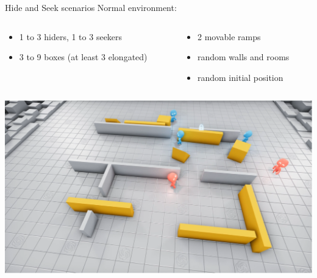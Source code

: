 \documentclass[9pt, hyperref={pdfusetitle,colorlinks=true,allcolors=DarkBlue}]{beamer}
\begin{document}
\begin{frame}{Hide and Seek scenarios}
Normal environment:

\begin{columns}
\begin{column}{0.5\textwidth}
\begin{itemize}
    \item 1 to 3 hiders, 1 to 3 seekers
    \item 3 to 9 boxes (at least 3 elongated)
    \end{itemize}{}
\end{column}
\begin{column}{0.5\textwidth}  %
    \begin{itemize}
    \item 2 movable ramps
    \item random walls and rooms
    \item random initial position
    \end{itemize}{}
\end{column}
\end{columns}
\begin{center}
    \includegraphics[scale=0.25]{normalEnv.png}
\end{center}{}
\end{frame}
\end{document}
